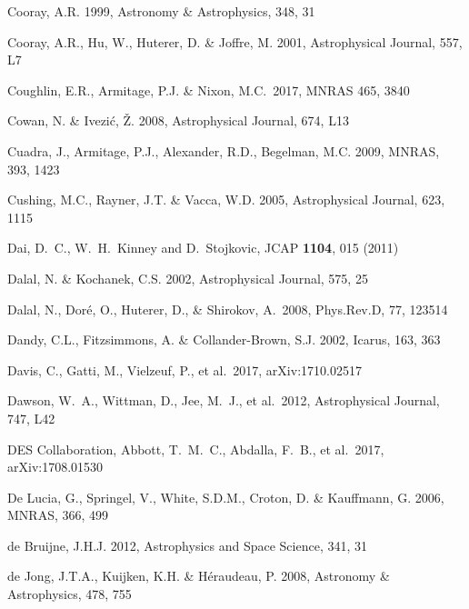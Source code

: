 \documentclass[twocolumn]{aastex61}
\begin{document}
\begin{thebibliography}{}
 Cooray, A.R. 1999, Astronomy \& Astrophysics, 348, 31

 Cooray, A.R., Hu, W., Huterer, D. \& Joffre, M. 2001, Astrophysical Journal, 557, L7

 Coughlin, E.R., Armitage,  P.J. \&  Nixon, M.C.~2017, MNRAS 465, 3840

 Cowan, N. \& Ivezi\'{c}, \v{Z}. 2008, Astrophysical Journal, 674, L13

 Cuadra, J., Armitage, P.J., Alexander, R.D., Begelman, M.C. 2009, MNRAS, 393, 1423

 Cushing, M.C., Rayner, J.T. \& Vacca, W.D. 2005, Astrophysical Journal, 623, 1115

 Dai, D.~C., W.~H.~Kinney and D.~Stojkovic, JCAP {\bf 1104}, 015 (2011)

 Dalal, N. \& Kochanek, C.S. 2002, Astrophysical Journal, 575, 25

 Dalal, N., Dor{\'e}, O., Huterer, D., \& Shirokov, A.\ 2008, Phys.Rev.D, 77, 123514

 Dandy, C.L., Fitzsimmons, A. \& Collander-Brown, S.J. 2002, Icarus, 163, 363

 Davis, C., Gatti, M., Vielzeuf, P., et al.\ 2017, arXiv:1710.02517

 Dawson, W.~A., Wittman, D., Jee, M.~J., et al.\ 2012, Astrophysical Journal, 747, L42

 DES Collaboration, Abbott, T.~M.~C., Abdalla, F.~B., et al.\ 2017, arXiv:1708.01530

 De Lucia, G., Springel, V., White, S.D.M., Croton, D. \& Kauffmann, G. 2006, MNRAS, 366, 499

 de Bruijne, J.H.J. 2012, Astrophysics and Space Science, 341, 31

 de Jong, J.T.A., Kuijken, K.H. \& H\'{e}raudeau, P. 2008, Astronomy \& Astrophysics, 478, 755


\end{thebibliography}
\end{document}
